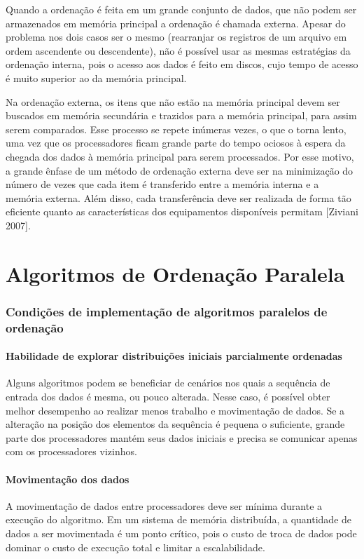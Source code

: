Quando a ordenação é feita em um grande conjunto de dados, que não podem ser armazenados em memória principal a ordenação é chamada externa. Apesar do problema nos dois casos ser o mesmo (rearranjar os registros de um arquivo em ordem ascendente ou descendente), não é possível usar as mesmas estratégias da ordenação interna, pois o acesso aos dados é feito em discos, cujo tempo de acesso é muito superior ao da memória principal.  %

Na ordenação externa, os itens que não estão na memória principal devem ser buscados em memória secundária e trazidos para a memória principal, para assim serem comparados. Esse processo se repete inúmeras vezes, o que o torna lento, uma vez que os processadores ficam grande parte do tempo ociosos à espera da chegada dos dados à memória principal para serem processados. Por esse motivo, a grande ênfase de um método de ordenação externa deve ser na minimização do número de vezes que cada item é transferido entre a memória interna e a memória externa. Além disso, cada transferência deve ser realizada de forma tão eficiente quanto as características dos equipamentos disponíveis permitam [Ziviani 2007].



\section{Algoritmos de Ordenação Paralela}

\subsubsection*{Condições de implementação de algoritmos paralelos de ordenação}

\paragraph*{  Habilidade de explorar distribuições iniciais parcialmente ordenadas}
Alguns algoritmos podem se beneficiar de cenários nos quais a sequência de entrada dos dados é mesma, ou pouco alterada. Nesse caso, é possível obter melhor desempenho ao realizar menos trabalho e movimentação de dados.
Se a alteração na posição dos elementos da sequência é pequena o suficiente, grande parte dos processadores mantém seus dados iniciais e precisa se comunicar apenas com os processadores vizinhos.


\paragraph*{Movimentação dos dados}
A movimentação de dados entre processadores deve ser mínima durante a execução do algoritmo. Em um sistema de memória distribuída, a quantidade de dados a ser movimentada é um ponto crítico, pois o custo de troca de dados pode dominar o custo de execução total e limitar a escalabilidade.


